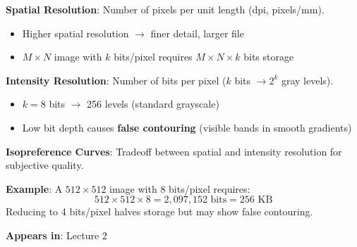 \documentclass[10pt]{article}
\begin{document}
\begin{conceptbox}

\begin{formulabox}
\textbf{Spatial Resolution}: Number of pixels per unit length (dpi, pixels/mm).
\begin{itemize}[leftmargin=1.5em, itemsep=0pt, topsep=2pt]
    \item Higher spatial resolution $\to$ finer detail, larger file
    \item $M \times N$ image with $k$ bits/pixel requires $M \times N \times k$ bits storage
\end{itemize}

\textbf{Intensity Resolution}: Number of bits per pixel ($k$ bits $\to 2^k$ gray levels).
\begin{itemize}[leftmargin=1.5em, itemsep=0pt, topsep=2pt]
    \item $k = 8$ bits $\to$ 256 levels (standard grayscale)
    \item Low bit depth causes \textbf{false contouring} (visible bands in smooth gradients)
\end{itemize}

\textbf{Isopreference Curves}: Tradeoff between spatial and intensity resolution for subjective quality.
\end{formulabox}

\begin{examplebox}
\textbf{Example}: A $512 \times 512$ image with 8 bits/pixel requires:
\[
512 \times 512 \times 8 = 2{,}097{,}152 \text{ bits} = 256 \text{ KB}
\]
Reducing to 4 bits/pixel halves storage but may show false contouring.
\end{examplebox}

\textbf{Appears in}: Lecture 2

\end{conceptbox}

\end{document}
